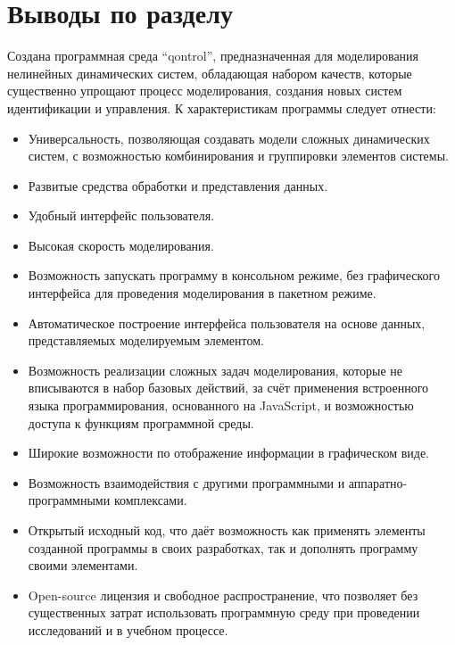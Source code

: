 \section{Выводы по разделу \thechapter} %

Создана программная среда ``qontrol'', предназначенная для моделирования
нелинейных динамических систем, обладающая набором качеств,
которые существенно упрощают процесс моделирования,
создания новых систем идентификации и управления.
К характеристикам программы следует отнести:

\begin{itemize}

  \item
    Универсальность, позволяющая создавать модели сложных динамических систем,
    с возможностью комбинирования и группировки элементов системы.

  \item
    Развитые средства обработки и представления данных.

  \item
    Удобный интерфейс пользователя.

  \item
    Высокая скорость моделирования.

  \item
    Возможность запускать программу в консольном режиме, без графического интерфейса
    для проведения моделирования в пакетном режиме.

  \item
    Автоматическое построение интерфейса пользователя на основе
    данных, представляемых моделируемым элементом.

  \item
    Возможность реализации сложных задач моделирования, которые не вписываются
    в набор базовых действий, за счёт применения встроенного языка программирования,
    основанного на JavaScript, и возможностью доступа к функциям программной среды.

  \item
    Широкие возможности по отображение информации в графическом виде.

  \item
    Возможность взаимодействия с другими программными и аппаратно-программными
    комплексами.


  \item
    Открытый исходный код, что даёт возможность как применять элементы созданной
    программы в своих разработках, так и дополнять программу своими элементами.


  \item
    Open-source лицензия и свободное распространение,
    что позволяет без существенных затрат использовать программную среду
    при проведении исследований и в учебном процессе.

\end{itemize}




